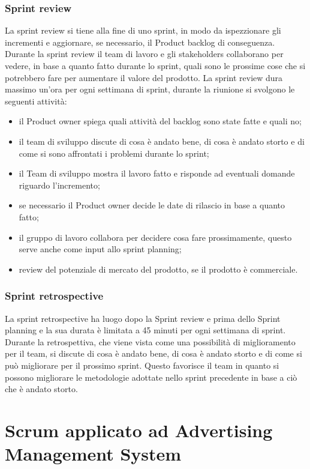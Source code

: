 \subsubsection{Sprint review}
La sprint review si tiene alla fine di uno sprint, in modo da ispezzionare gli incrementi e aggiornare, se necessario, il Product backlog di conseguenza. Durante la sprint review il team di lavoro e gli stakeholders collaborano per vedere, in base a quanto fatto durante lo sprint, quali sono le prossime cose che si potrebbero fare per aumentare il valore del prodotto. La sprint review dura massimo un'ora per ogni settimana di sprint, durante la riunione si svolgono le seguenti attività:
\begin{itemize}
    \item il Product owner spiega quali attività del backlog sono state fatte e quali no;
    \item il team di sviluppo discute di cosa è andato bene, di cosa è andato storto e di come si sono affrontati i problemi durante lo sprint;
    \item il Team di sviluppo mostra il lavoro fatto e risponde ad eventuali domande riguardo l'incremento;
    \item se necessario il Product owner decide le date di rilascio in base a quanto fatto;
    \item il gruppo di lavoro collabora per decidere cosa fare prossimamente, questo serve anche come input allo sprint planning;
    \item review del potenziale di mercato del prodotto, se il prodotto è commerciale.
\end{itemize}

\subsubsection{Sprint retrospective}
La sprint retrospective ha luogo dopo la Sprint review e prima dello Sprint planning e la sua durata è limitata a 45 minuti per ogni settimana di sprint. Durante la retrospettiva, che viene vista come una possibilità di miglioramento per il team, si discute di cosa è andato bene, di cosa è andato storto e di come si può migliorare per il prossimo sprint. Questo favorisce il team in quanto si possono migliorare le metodologie adottate nello sprint precedente in base a ciò che è andato storto.


\section{Scrum applicato ad Advertising Management System}